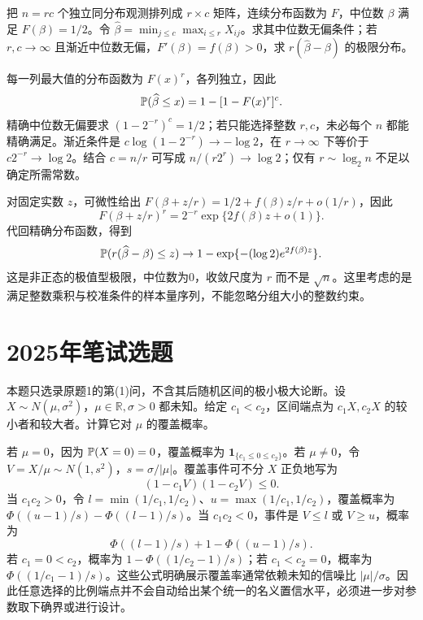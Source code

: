\begin{example}[原题5：分组极大值再取最小值的中位数估计]\label{yau:2024-5}
把 $n=rc$ 个独立同分布观测排列成 $r\times c$ 矩阵，连续分布函数为 $F$，中位数 $\beta$ 满足 $F(\beta)=1/2$。令 $\widehat\beta=\min_{j\le c}\max_{i\le r}X_{ij}$。求其中位数无偏条件；若 $r,c\to\infty$ 且渐近中位数无偏，$F'(\beta)=f(\beta)>0$，求 $r(\widehat\beta-\beta)$ 的极限分布。
\end{example}
\begin{solve}
每一列最大值的分布函数为 $F(x)^r$，各列独立，因此
\[
\mathbb P(\widehat\beta\le x)=1-[1-F(x)^r]^c.
\]
精确中位数无偏要求 $(1-2^{-r})^c=1/2$；若只能选择整数 $r,c$，未必每个 $n$ 都能精确满足。渐近条件是 $c\log(1-2^{-r})\to-\log2$，在 $r\to\infty$ 下等价于 $c2^{-r}\to\log2$。结合 $c=n/r$ 可写成 $n/(r2^r)\to\log2$；仅有 $r\sim\log_2 n$ 不足以确定所需常数。

对固定实数 $z$，可微性给出 $F(\beta+z/r)=1/2+f(\beta)z/r+o(1/r)$，因此
\[
F(\beta+z/r)^r=2^{-r}\exp\{2f(\beta)z+o(1)\}.
\]
代回精确分布函数，得到
\[
\mathbb P(r(\widehat\beta-\beta)\le z)\to
1-\exp\{-(\log2)e^{2f(\beta)z}\}.
\]
这是非正态的极值型极限，中位数为0，收敛尺度为 $r$ 而不是 $\sqrt n$。这里考虑的是满足整数乘积与校准条件的样本量序列，不能忽略分组大小的整数约束。
\end{solve}

\section{2025年笔试选题}
\begin{example}[原题1(1)：单个正态观测的比例型置信区间]\label{yau:2025-1}
本题只选录原题1的第(1)问，不含其后随机区间的极小极大论断。设 $X\sim N(\mu,\sigma^2)$，$\mu\in\mathbb R,\sigma>0$ 都未知。给定 $c_1<c_2$，区间端点为 $c_1X,c_2X$ 的较小者和较大者。计算它对 $\mu$ 的覆盖概率。
\end{example}
\begin{solve}
若 $\mu=0$，因为 $\mathbb P(X=0)=0$，覆盖概率为 $\mathbf1_{\{c_1\le0\le c_2\}}$。若 $\mu\ne0$，令 $V=X/\mu\sim N(1,s^2)$，$s=\sigma/|\mu|$。覆盖事件可不分 $X$ 正负地写为
\[
(1-c_1V)(1-c_2V)\le0.
\]
当 $c_1c_2>0$，令 $l=\min(1/c_1,1/c_2)$、$u=\max(1/c_1,1/c_2)$，覆盖概率为 $\Phi((u-1)/s)-\Phi((l-1)/s)$。当 $c_1c_2<0$，事件是 $V\le l$ 或 $V\ge u$，概率为
\[
\Phi((l-1)/s)+1-\Phi((u-1)/s).
\]
若 $c_1=0<c_2$，概率为 $1-\Phi((1/c_2-1)/s)$；若 $c_1<c_2=0$，概率为 $\Phi((1/c_1-1)/s)$。这些公式明确展示覆盖率通常依赖未知的信噪比 $|\mu|/\sigma$。因此任意选择的比例端点并不会自动给出某个统一的名义置信水平，必须进一步对参数取下确界或进行设计。
\end{solve}

